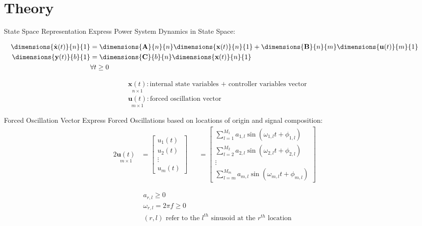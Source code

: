 \section[Theory]{Theory}
\label{sec:lasso_theory}

\begin{frame}[fragile]{State Space Representation}
	Express Power System Dynamics in State Space:

	\begin{align}
		\dimensions{\dot{\textbf{x}}(t)}{n}{1} &= 
		\dimensions{\textbf{A}}{n}{n} \dimensions{\textbf{x}(t)}{n}{1}
		+ \dimensions{\textbf{B}}{n}{m} \dimensions{\textbf{u}(t)}{m}{1} \nonumber\\
		
		\dimensions{\textbf{y}(t)}{b}{1} &= 
		\dimensions{\textbf{C}}{b}{n} \dimensions{\textbf{x}(t)}{n}{1}\\  
		& \forall t\geq0 \nonumber
	\end{align}
	
	\begin{align*}
		& \underset{\scriptscriptstyle n\times 1}{\textbf{x}(t)} : \text{internal state variables + controller variables vector}                                                                      \\
		& \underset{\scriptscriptstyle m\times 1}{\textbf{u}(t)} : \text{forced oscillation vector}
	\end{align*}
\end{frame}

\begin{frame}[fragile]{Forced Oscillation Vector}
	Express Forced Oscillations based on locations of origin and signal composition:
	\begin{alignat}{2}
		\underset{\scriptscriptstyle m\times 1}{\textbf{u}(t)} 
		&= 
		\begin{bmatrix}
			u_1(t) \\
			u_2(t) \\
			\vdots \\
			u_m(t)
		\end{bmatrix} 
		& &=
		\begin{bmatrix}
			\sum_{l=1}^{M_1} a_{1,l} \sin(\omega_{1,l}t + \phi_{1,l}) \\
			\sum_{l=2}^{M_2} a_{2,l} \sin(\omega_{2,l}t + \phi_{2,l}) \\
			\vdots \\
			\sum_{l=m}^{M_m} a_{m,l} \sin(\omega_{m,l}t + \phi_{m,l})
		\end{bmatrix} 
	\end{alignat}
	
	\begin{align*}
		& a_{r,l} \geq0 \\
		& \omega_{r,l} = 2\pi f \geq 0 \\
		& (r,l) \text{ refer to the } l^{th} \text{ sinusoid at the }  r^{th} \text{ location}
	\end{align*}

\end{frame}